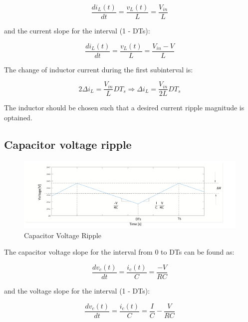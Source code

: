 \begin{equation}
	\frac{di_L(t)}{dt} = \frac{v_L(t)}{L} = \frac{V_{in}}{L}
	\label{eq:CBC_ICR1}
\end{equation}

and the current slope for the interval (1 - DTs):

\begin{equation}
	\frac{di_L(t)}{dt} = \frac{v_L(t)}{L} = \frac{V_{in} - V}{L}
	\label{eq:CBC_ICR2}
\end{equation}

The change of inductor current during the first subinterval is:

\begin{equation}
	2\Delta i_L = \frac{V_{in}}{L}DT_s \Rightarrow
  \Delta i_L = \frac{V_{in}}{2L}DT_s
	\label{eq:CBC_ICR3}
\end{equation}

The inductor should be chosen such that a desired current ripple magnitude is optained.

\subsection{Capacitor voltage ripple}\label{sec:CBC_CVR}

\begin{figure}[H]
   \centering
   \includegraphics[width=\textwidth]{figures/aConventionalBoost/CapacitorVoltage.pdf}
    \caption{Capacitor Voltage Ripple}
	\label{fig:CBC_CVR1}
\end{figure}

The capacitor voltage slope for the interval from 0 to DTs can be found as:

\begin{equation}
	\frac{dv_c(t)}{dt} = \frac{i_c(t)}{C} = \frac{-V}{RC}
	\label{eq:CBC_CVR2}
\end{equation}

and the voltage slope for the interval (1 - DTs):

\begin{equation}
	\frac{dv_c(t)}{dt} = \frac{i_c(t)}{C} = \frac{I}{C} - \frac{V}{RC}
	\label{eq:CBC_CVR3}
\end{equation}


